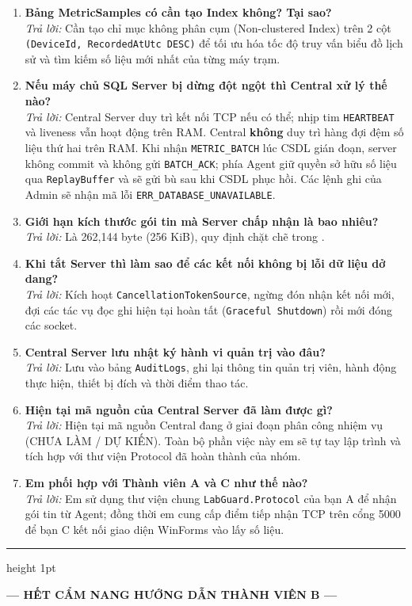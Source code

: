 \documentclass[12pt,a4paper]{article}
\begin{document}
\begin{enumerate}[leftmargin=*, label=\textbf{Câu \arabic*:}]
    \textit{Trả lời:} Bằng cách kiểm tra số lượng phần tử trong \texttt{Concurrent\allowbreak{}Dictionary}. Nếu vượt quá ngưỡng (ví dụ 100 kết nối), máy chủ từ chối kết nối mới bằng cách đóng socket ngay lập tức.
  \item \textbf{Bảng MetricSamples có cần tạo Index không? Tại sao?} \\
    \textit{Trả lời:} Cần tạo chỉ mục không phân cụm (Non-clustered Index) trên 2 cột \texttt{(DeviceId, RecordedAtUtc DESC)} để tối ưu hóa tốc độ truy vấn biểu đồ lịch sử và tìm kiếm số liệu mới nhất của từng máy trạm.
  \item \textbf{Nếu máy chủ SQL Server bị dừng đột ngột thì Central xử lý thế nào?} \\
    \textit{Trả lời:} Central Server duy trì kết nối TCP nếu có thể; nhịp tim \texttt{HEARTBEAT} và liveness vẫn hoạt động trên RAM. Central \textbf{không} duy trì hàng đợi đệm số liệu thứ hai trên RAM. Khi nhận \texttt{METRIC\_BATCH} lúc CSDL gián đoạn, server không commit và không gửi \texttt{BATCH\_ACK}; phía Agent giữ quyền sở hữu số liệu qua \texttt{ReplayBuffer} và sẽ gửi bù sau khi CSDL phục hồi. Các lệnh ghi của Admin sẽ nhận mã lỗi \texttt{ERR\_DATABASE\_UNAVAILABLE}.
  \item \textbf{Giới hạn kích thước gói tin mà Server chấp nhận là bao nhiêu?} \\
    \textit{Trả lời:} Là 262,144 byte (256 KiB), quy định chặt chẽ trong .
  \item \textbf{Khi tắt Server thì làm sao để các kết nối không bị lỗi dữ liệu dở dang?} \\
    \textit{Trả lời:} Kích hoạt \texttt{CancellationTokenSource}, ngừng đón nhận kết nối mới, đợi các tác vụ đọc ghi hiện tại hoàn tất (\texttt{Graceful Shutdown}) rồi mới đóng các socket.
  \item \textbf{Central Server lưu nhật ký hành vi quản trị vào đâu?} \\
    \textit{Trả lời:} Lưu vào bảng \texttt{AuditLogs}, ghi lại thông tin quản trị viên, hành động thực hiện, thiết bị đích và thời điểm thao tác.
  \item \textbf{Hiện tại mã nguồn của Central Server đã làm được gì?} \\
    \textit{Trả lời:} Hiện tại mã nguồn Central đang ở giai đoạn phân công nhiệm vụ (CHƯA LÀM / DỰ KIẾN). Toàn bộ phần việc này em sẽ tự tay lập trình và tích hợp với thư viện Protocol đã hoàn thành của nhóm.
  \item \textbf{Em phối hợp với Thành viên A và C như thế nào?} \\
    \textit{Trả lời:} Em sử dụng thư viện chung \texttt{LabGuard.Protocol} của bạn A để nhận gói tin từ Agent; đồng thời em cung cấp điểm tiếp nhận TCP trên cổng 5000 để bạn C kết nối giao diện WinForms vào lấy số liệu.
\end{enumerate}

\begin{center}
  \vspace{10mm}
  {\color{lgDeepBlue}\hrule height 1pt}
  \vspace{4mm}
  {\bfseries\color{lgSlate} — HẾT CẨM NANG HƯỚNG DẪN THÀNH VIÊN B —\par}
\end{center}
\end{document}
